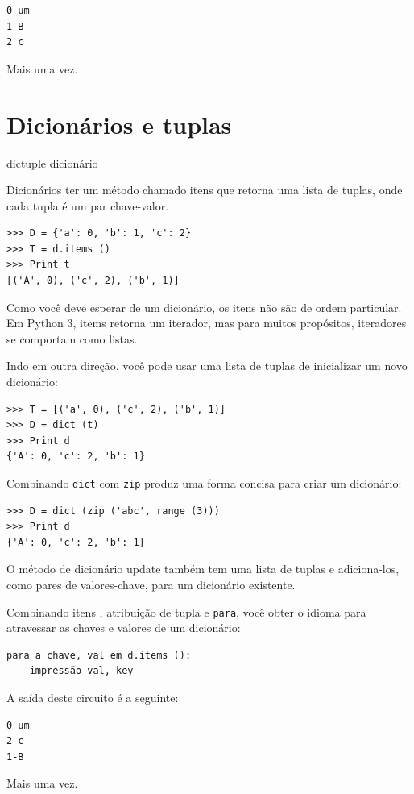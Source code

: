 \documentclass[10pt]{book}
\begin{document}
\begin{v erbatim}
{\begin{verbatim}
0 um
1-B
2 c
\end{verbatim}
%
Mais uma vez.


\section{Dicionários e tuplas}
\label{} dictuple
\index{} dicionário

Dicionários ter um método chamado {itens \tt} que retorna uma lista de
tuplas, onde cada tupla é um par chave-valor.

\begin{verbatim}
>>> D = {'a': 0, 'b': 1, 'c': 2}
>>> T = d.items ()
>>> Print t
[('A', 0), ('c', 2), ('b', 1)]
\end{verbatim}
%
Como você deve esperar de um dicionário, os itens não são de
ordem particular. Em Python 3, {items \tt} retorna um iterador,
mas para muitos propósitos, iteradores se comportam como listas.

Indo em outra direção, você pode usar uma lista de tuplas de
inicializar um novo dicionário: 

\begin{verbatim}
>>> T = [('a', 0), ('c', 2), ('b', 1)]
>>> D = dict (t)
>>> Print d
{'A': 0, 'c': 2, 'b': 1}
\end{verbatim}

Combinando {\tt dict} com {\tt zip} produz uma forma concisa
para criar um dicionário:

\begin{verbatim}
>>> D = dict (zip ('abc', range (3)))
>>> Print d
{'A': 0, 'c': 2, 'b': 1}
\end{verbatim}
%
O método de dicionário {update \tt} também tem uma lista de tuplas
e adiciona-los, como pares de valores-chave, para um dicionário existente.

Combinando itens {\tt}, atribuição de tupla e {\tt para}, você
obter o idioma para atravessar as chaves e valores de um dicionário:

\begin{verbatim}
para a chave, val em d.items ():
    impressão val, key
\end{verbatim}
%
A saída deste circuito é a seguinte:

\begin{verbatim}
0 um
2 c
1-B
\end{verbatim}
%
Mais uma vez.

}
\end{v erbatim}
\end{document}
